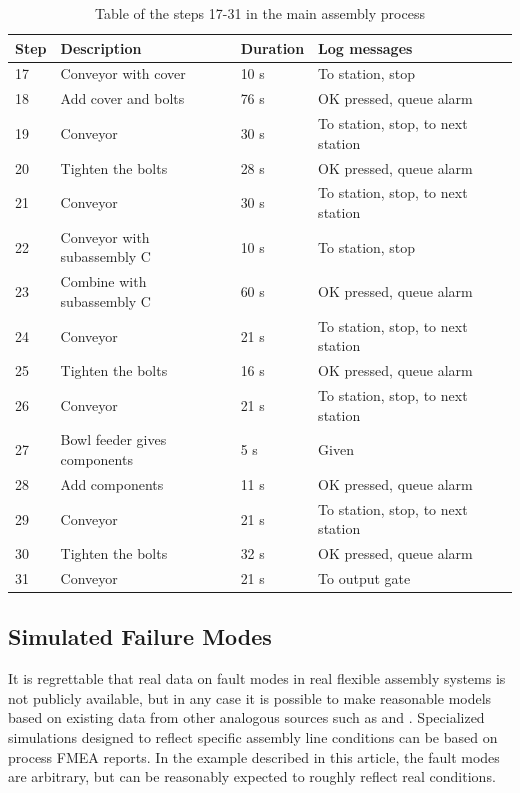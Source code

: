 \documentclass[journal]{IEEEtran}
\begin{document}
\begin{table}[!t]
\renewcommand{\arraystretch}{1.3}
\caption{Table of the steps 17-31 in the main assembly process}
\label{mainsteps2}
\centering
\begin{tabular}{|p{5mm}|p{20mm}|p{10mm}|p{15mm}|p{15mm}|}
\hline
Step & Description & Duration & Log messages \\
\hline
\hline
17 & Conveyor with cover & 10 s & To station, stop \\
\hline
18 & Add cover and bolts & 76 s & OK pressed, queue alarm \\
\hline
19 & Conveyor & 30 s & To station, stop, to next station \\
\hline
20 & Tighten the bolts & 28 s & OK pressed, queue alarm \\
\hline
21 & Conveyor & 30 s & To station, stop, to next station \\
\hline
22 & Conveyor with subassembly C & 10 s & To station, stop \\
\hline
23 & Combine with subassembly C & 60 s & OK pressed, queue alarm \\
\hline
24 & Conveyor & 21 s & To station, stop, to next station \\
\hline
25 & Tighten the bolts & 16 s & OK pressed, queue alarm \\
\hline
26 & Conveyor & 21 s & To station, stop, to next station \\
\hline
27 & Bowl feeder gives components & 5 s & Given \\
\hline
28 & Add components & 11 s & OK pressed, queue alarm \\
\hline
29 & Conveyor & 21 s & To station, stop, to next station \\
\hline
30 & Tighten the bolts & 32 s & OK pressed, queue alarm \\
\hline
31 & Conveyor & 21 s & To output gate \\
\hline
\end{tabular}
\end{table}

\subsection{Simulated Failure Modes}
It is regrettable that real data on fault modes in real flexible assembly systems is not publicly available, but in any case it is possible to make reasonable
models based on existing data from other analogous sources such as \cite{nasaames} and \cite{tsarouhas2009classification}. Specialized simulations designed
to reflect specific assembly line conditions can be based on process FMEA reports. In the example described in this article, the fault modes are arbitrary, but 
can be reasonably expected to roughly reflect real conditions.
\end{document}
